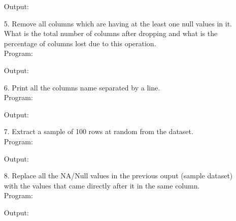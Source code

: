 \documentclass[a4paper,11pt,openright]{report}
\begin{document}
\begin{enumerate}
Output:


\vspace{5px}

\item[5.] Remove all columns which are having at the least one null values in it. What is 
the total number of columns after dropping and what is the percentage of columns lost due to
this operation. \\

Program:


\vspace{5px}

Output:


\vspace{5px}

\item[6.] Print all the columns name separated by a line. \\

Program:


\vspace{5px}

Output:


\vspace{5px}

\pagebreak

\item[7.] Extract a sample of 100 rows at random from the dataset. \\

Program:


\vspace{5px}

Output:


\vspace{5px}

\item[8.] Replace all the NA/Null values in the previous ouput (sample dataset) with the 
values that came directly after it in the same column. \\

Program:


\vspace{5px}

Output:


\vspace{5px}


\end{enumerate}
\end{document}
